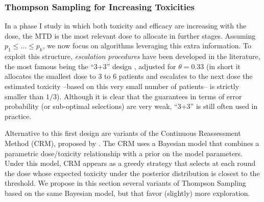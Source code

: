 \subsubsection{Thompson Sampling for Increasing Toxicities}\label{sec:TSIncreasing}

In a phase I study in which both toxicity and efficacy are increasing with the dose, the MTD is the most relevant dose to allocate in further stages. Assuming $p_1 \leq \dots \leq p_k$, we now focus on algorithms leveraging this extra information. 
To exploit this structure, \emph{escalation procedures} have been developed in the literature, the most famous being the ``3+3'' design \cite{storer89}, adjusted for $\theta=0.33$ (in short it allocates the smallest dose to 3 to 6 patients and escalates to the next dose the estimated toxicity --based on this very small number of patients-- is strictly smaller than $1/3$). 
Although it is clear that the guarantees in terms of error probability (or sub-optimal selections) are very weak, ``3+3'' is still often used in practice.

Alternative to this first design are variants of the Continuous Reassessment Method (CRM), proposed by \cite{OQuigley90CRM}. The CRM uses a Bayesian model that combines a parametric dose/toxicity relationship with a prior on the model parameters. Under this model, CRM appears as a greedy strategy that selects at each round the dose whose expected toxicity under the posterior distribution is closest to the threshold. We propose in this section several variants of Thompson Sampling based on the same Bayesian model, but that favor (slightly) more exploration. 

